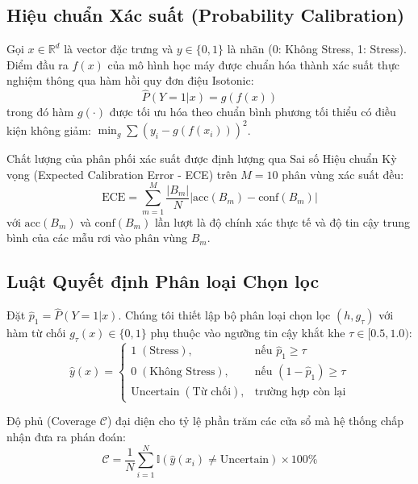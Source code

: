 \documentclass[conference]{IEEEtran}
\begin{document}
\subsection{Hiệu chuẩn Xác suất (Probability Calibration)}
Gọi $x \in \mathbb{R}^d$ là vector đặc trưng và $y \in \{0, 1\}$ là nhãn (0: Không Stress, 1: Stress). Điểm đầu ra $f(x)$ của mô hình học máy được chuẩn hóa thành xác suất thực nghiệm thông qua hàm hồi quy đơn điệu Isotonic:
\begin{equation}
\hat{P}(Y=1|x) = g(f(x))
\end{equation}
trong đó hàm $g(\cdot)$ được tối ưu hóa theo chuẩn bình phương tối thiểu có điều kiện không giảm: $\min_g \sum (y_i - g(f(x_i)))^2$.

Chất lượng của phân phối xác suất được định lượng qua Sai số Hiệu chuẩn Kỳ vọng (Expected Calibration Error - ECE) trên $M=10$ phân vùng xác suất đều:
\begin{equation}
\text{ECE} = \sum_{m=1}^M \frac{|B_m|}{N} \left| \text{acc}(B_m) - \text{conf}(B_m) \right|
\end{equation}
với $\text{acc}(B_m)$ và $\text{conf}(B_m)$ lần lượt là độ chính xác thực tế và độ tin cậy trung bình của các mẫu rơi vào phân vùng $B_m$.

\subsection{Luật Quyết định Phân loại Chọn lọc}
Đặt $\hat{p}_1 = \hat{P}(Y=1|x)$. Chúng tôi thiết lập bộ phân loại chọn lọc $(h, g_\tau)$ với hàm từ chối $g_\tau(x) \in \{0, 1\}$ phụ thuộc vào ngưỡng tin cậy khắt khe $\tau \in [0.5, 1.0)$:
\begin{equation}
\hat{y}(x) = 
\begin{cases} 
1 \; (\text{Stress}), & \text{nếu } \hat{p}_1 \ge \tau \\
0 \; (\text{Không Stress}), & \text{nếu } (1 - \hat{p}_1) \ge \tau \\
\text{Uncertain} \; (\text{Từ chối}), & \text{trường hợp còn lại}
\end{cases}
\end{equation}

Độ phủ (Coverage $\mathcal{C}$) đại diện cho tỷ lệ phần trăm các cửa sổ mà hệ thống chấp nhận đưa ra phán đoán:
\begin{equation}
\mathcal{C} = \frac{1}{N} \sum_{i=1}^N \mathbb{I}(\hat{y}(x_i) \neq \text{Uncertain}) \times 100\%
\end{equation}
\end{document}
